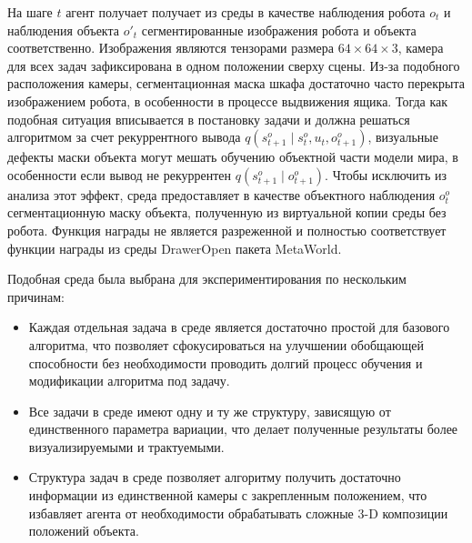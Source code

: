 На шаге $t$ агент получает получает из среды в качестве наблюдения робота $o_t$ и наблюдения объекта $o'_t$ сегментированные изображения робота и объекта соответственно.
Изображения являются тензорами размера $64 \times 64 \times 3$, камера для всех задач зафиксирована в одном положении сверху сцены.
Из-за подобного расположения камеры, сегментационная маска шкафа достаточно часто перекрыта изображением робота, в особенности в процессе выдвижения ящика.
Тогда как подобная ситуация вписывается в постановку задачи и должна решаться алгоритмом за счет рекуррентного вывода $q(s^o_{t+1} \mid s^o_{t}, u_t, o^o_{t+1})$, визуальные дефекты маски объекта могут мешать обучению объектной части модели мира, в особенности если вывод не рекуррентен $q(s^o_{t+1} \mid o^o_{t+1})$.
Чтобы исключить из анализа этот эффект, среда предоставляет в качестве объектного наблюдения $o^o_t$ сегментационную маску объекта, полученную из виртуальной копии среды без робота.
Функция награды не является разреженной и полностью соответствует функции награды из среды DrawerOpen пакета MetaWorld.

Подобная среда была выбрана для экспериментирования по нескольким причинам:
\begin{itemize}
    \item Каждая отдельная задача в среде является достаточно простой для базового алгоритма, что позволяет сфокусироваться на улучшении обобщающей способности без необходимости проводить долгий процесс обучения и модификации алгоритма под задачу.
    \item Все задачи в среде имеют одну и ту же структуру, зависящую от единственного параметра вариации, что делает полученные результаты более визуализируемыми и трактуемыми.
    \item Структура задач в среде позволяет алгоритму получить достаточно информации из единственной камеры с закрепленным положением, что избавляет агента от необходимости обрабатывать сложные 3-D композиции положений объекта.
\end{itemize}

